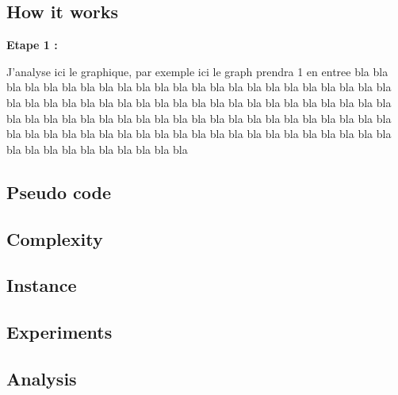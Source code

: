 \documentclass{article}
\begin{document}

    \subsection{How it works}

    \hspace*{1cm} \textbf{Etape 1 :}
    \\
        \hspace{1em}
        \begin{minipage}{29em}
            J'analyse ici le graphique, par exemple ici le graph prendra 1 en entree bla bla bla bla bla bla bla bla bla bla bla bla bla bla bla bla bla bla bla bla bla bla bla bla bla bla bla bla bla bla bla bla bla bla bla bla bla bla bla bla bla bla bla bla bla bla bla bla bla bla bla bla bla bla bla bla bla bla bla bla bla bla bla bla bla bla bla bla bla bla bla bla bla bla bla bla bla bla bla bla bla bla bla bla bla bla bla bla bla bla bla bla bla bla bla bla
        \end{minipage}

    

    \subsection{Pseudo code}


    \subsection{Complexity}


    \subsection{Instance}


    \subsection{Experiments}


    \subsection{Analysis    }
\end{document}
